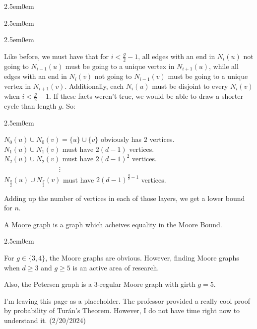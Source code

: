 \documentclass{book}
\newcommand{\teachComment}{
   \color{Orange}%
   \fontsize{12}{14}\selectfont%
}
\newenvironment{myIndent}{%
   \begin{adjustwidth}{2.5em}{0em}%
}{%
   \end{adjustwidth}%
}
\newcommand{\udefine}[1]{{%
   \setulcolor{Red}%
   \setul{0.14em}{0.07em}%
   \ul{#1}%
}}
\newcommand{\retTwo}{\hfill\bigbreak}
\begin{document}
{\begin{myIndent}
{\begin{myIndent}
{\begin{myIndent}
         \newpage

         Like before, we must have that for $i < \frac{g}{2} - 1$, all edges with an end in $N_i(u)$ not going to $N_{i-1}(u)$ must be going to a unique vertex in $N_{i+1}(u)$, while all edges with an end in $N_i(v)$ not going to $N_{i-1}(v)$ must be going to a unique vertex in $N_{i+1}(v)$. Additionally, each $N_i(u)$ must be disjoint to every  $N_i(v)$ when $i < \frac{g}{2} - 1$. If these facts weren't true, we would be able to draw a shorter cycle than length $g$. So: \\ [-6pt]
         \begin{myIndent}
            \bullet \quad $N_0(u) \cup N_0(v) = \{u\} \cup \{v\}$ obviously has $2$ vertices.\\
            \bullet \quad $N_1(u) \cup N_1(v)$ must have $2(d-1)$ vertices.\\
            \bullet \quad $N_2(u) \cup N_2(v)$ must have $2(d-1)^2$ vertices.\\
            $\phantom{aaaaaaaaaaaaaaa} \vdots$\\
            \bullet \quad $N_{\frac{g}{2}}(u) \cup N_{\frac{g}{2}}(v)$ must have $2(d-1)^{{\frac{g}{2} - 1}}$ vertices.\\
         \end{myIndent}

         Adding up the number of vertices in each of those layers, we get a lower bound for $n$.
         \retTwo
      \end{myIndent}}
   \end{myIndent}}
\end{myIndent}}

A \udefine{Moore graph} is a graph which acheives equality in the Moore Bound.

{\begin{myIndent} \teachComment
   For $g \in \{3, 4\}$, the Moore graphs are obvious. However, finding Moore graphs when $d \geq 3$ and $g \geq 5$ is an active area of research. \retTwo

   Also, the Petersen graph is a $3$-regular Moore graph with girth $g = 5$.
\end{myIndent}}



\newpage

{\color{BrickRed}
   I'm leaving this page as a placeholder. The professor provided a really cool proof by probability of Turán's Theorem. However, I do not have time right now to understand it. (2/20/2024)
}
\end{document}
